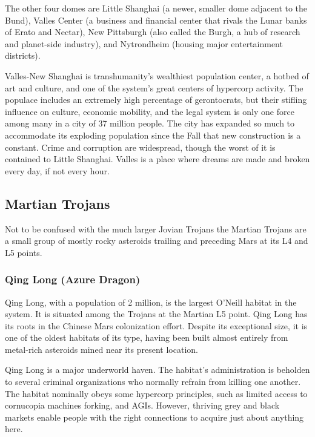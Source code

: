 The other four domes are Little Shanghai (a newer, 
smaller dome adjacent to the Bund), Valles Center 
(a business and financial center that rivals the Lunar 
banks of Erato and Nectar), New Pittsburgh (also 
called the Burgh, a hub of research and planet-side 
industry), and Nytrondheim (housing major entertainment
districts).

Valles-New Shanghai is transhumanity's wealthiest 
population center, a hotbed of art and culture, and 
one of the system's great centers of hypercorp activity. 
The populace includes an extremely high percentage
of gerontocrats, but their stifling influence on
culture, economic mobility, and the legal system is 
only one force among many in a city of 37 million 
people. The city has expanded so much to accommodate
its exploding population since the Fall that
new construction is a constant. Crime and corruption 
are widespread, though the worst of it is contained 
to Little Shanghai. Valles is a place where dreams are 
made and broken every day, if not every hour.

\subsection{Martian Trojans}

Not to be confused with the much larger Jovian Trojans
the Martian Trojans are a small group of mostly
rocky asteroids trailing and preceding Mars at its L4 
and L5 points.

\subsubsection{Qing Long (Azure Dragon)}

Qing Long, with a population of 2 million, is the 
largest O'Neill habitat in the system. It is situated 
among the Trojans at the Martian L5 point. Qing 
Long has its roots in the Chinese Mars colonization 
effort. Despite its exceptional size, it is one of the 
oldest habitats of its type, having been built almost 
entirely from metal-rich asteroids mined near its 
present location.

Qing Long is a major underworld haven. The habitat's
administration is beholden to several criminal
organizations who normally refrain from killing one 
another. The habitat nominally obeys some hypercorp 
principles, such as limited access to cornucopia machines
forking, and AGIs. However, thriving grey and
black markets enable people with the right connections
to acquire just about anything here.

